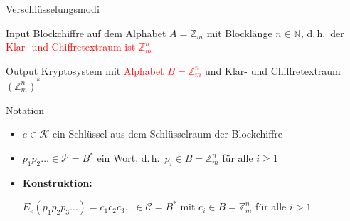 \documentclass{beamer}
\newcommand{\mc}{\mathcal}
\newcommand{\N}{\mathbb{N}}
\newcommand{\Z}{\mathbb{Z}}
\newcommand{\tred}[1]{{\textcolor{red}{#1}}}
\theoremstyle{plain}
\begin{document}
\begin{frame}{Verschlüsselungsmodi}{\ }
 
 \begin{block}{Input}
  Blockchiffre auf dem Alphabet $A = \Z_m$ mit Blocklänge $n \in \N$, d.\,h.\ der \tred{Klar- und Chiffretextraum ist $\Z_m^n$}
 \end{block}

 \begin{block}{Output}
 Kryptosystem mit \tred{Alphabet $B = \Z_m^n$} und Klar- und Chiffretextraum $(\Z_m^n)^*$
 \end{block}
\pause

\begin{block}{Notation}
 \begin{itemize}
  \item $e \in \mc K$ ein Schlüssel aus dem Schlüsselraum der Blockchiffre
  \item $p_1p_2\dotsc \in \mc P = B^*$ ein Wort, d.\,h.\ $p_i \in B = \Z_m^n$ für alle $i \geq 1$
  \item \textbf{Konstruktion:} 
  
  $E_e(p_1p_2p_3\dotsc) = c_1c_2c_3\dotsc \in \mc C = B^*$ mit $c_i \in B = \Z_m^n$ für alle $i > 1$ 
 \end{itemize}
\end{block}
\end{frame}
\end{document}
